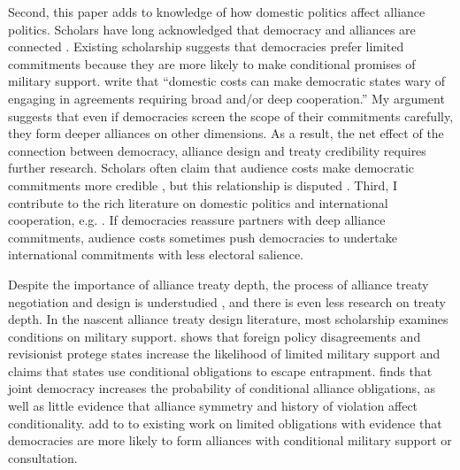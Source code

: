 \documentclass[12pt]{article}
\begin{document}
Second, this paper adds to knowledge of how domestic politics affect alliance politics. 
Scholars have long acknowledged that democracy and alliances are connected \citep{LaiReiter2000, GiblerWolford2006, Mattes2012, Warren2016, McManusYarhi-Milo2017}. 
Existing scholarship suggests that democracies prefer limited commitments \citep{Mattes2012, Chibaetal2015, FjelstulReiter2019} because they are more likely to make conditional promises of military support. 
\citet{Chibaetal2015} write that ``domestic costs can make democratic states wary of engaging in agreements requiring broad and/or deep cooperation.'' 
My argument suggests that even if democracies screen the scope of their commitments carefully, they form deeper alliances on other dimensions.  
As a result, the net effect of the connection between democracy, alliance design and treaty credibility requires further research.
Scholars often claim that audience costs make democratic commitments more credible \citep{Gaubatz1996, Leedsetal2009, DigiuseppePoast2016}, but this relationship is disputed \citep{GartzkeGleditsch2004, DownesSechser2012}.  
Third, I contribute to the rich literature on domestic politics and international cooperation, e.g. \citep{DownesRocke1995, Fearon1998, Leeds1999, MattesRodriguez2014}. 
If democracies reassure partners with deep alliance commitments, audience costs sometimes push democracies to undertake international commitments with less electoral salience. 


Despite the importance of alliance treaty depth, the process of alliance treaty negotiation and design is understudied \citep{Poast2019a}, and there is even less research on treaty depth. 
In the nascent alliance treaty design literature, most scholarship examines conditions on military support.
\citet{Benson2012} shows that foreign policy disagreements and revisionist protege states increase the likelihood of limited military support and \citet{Kim2011} claims that states use conditional obligations to escape entrapment. 
\citet{Mattes2012} finds that joint democracy increases the probability of conditional alliance obligations, as well as little evidence that alliance symmetry and history of violation affect conditionality. 
\citet{Chibaetal2015} add to to existing work on limited obligations with evidence that democracies are more likely to form alliances with conditional military support or consultation. 
\end{document}
